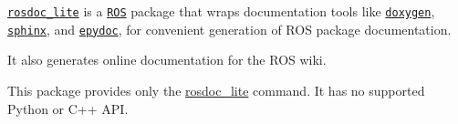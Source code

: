\href{http://wiki.ros.org/rosdoc_lite}{\tt rosdoc\+\_\+lite} is a \href{http://www.ros.org}{\tt R\+OS} package that wraps documentation tools like \href{http://www.doxygen.org}{\tt doxygen}, \href{http://sphinx-doc.org}{\tt sphinx}, and \href{http://epydoc.sourceforge.net/}{\tt epydoc}, for convenient generation of R\+OS package documentation.

It also generates online documentation for the R\+OS wiki.

This package provides only the {\ttfamily \hyperlink{namespacerosdoc__lite}{rosdoc\+\_\+lite}} command. It has no supported Python or C++ A\+PI. 